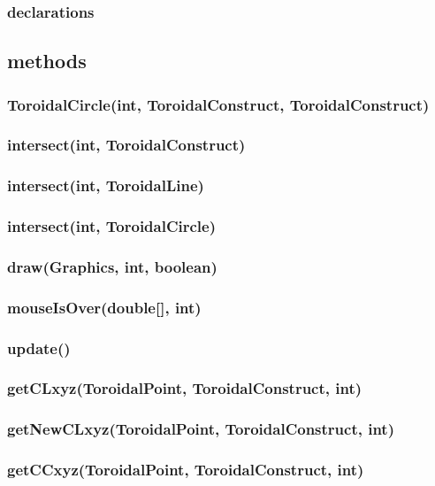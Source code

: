 \documentclass[a4paper,10pt]{report}
\begin{document}
\subsubsection{declarations}
\subsubsection{}
\subsection{methods}
\subsubsection{ToroidalCircle(int, ToroidalConstruct, ToroidalConstruct)}
\subsubsection{intersect(int, ToroidalConstruct)}
\subsubsection{intersect(int, ToroidalLine)}
\subsubsection{intersect(int, ToroidalCircle)}
\subsubsection{draw(Graphics, int, boolean)}
\subsubsection{mouseIsOver(double[], int)}
\subsubsection{update()}
\subsubsection{getCLxyz(ToroidalPoint, ToroidalConstruct, int)}
\subsubsection{getNewCLxyz(ToroidalPoint, ToroidalConstruct, int)}
\subsubsection{getCCxyz(ToroidalPoint, ToroidalConstruct, int)}
\end{document}
